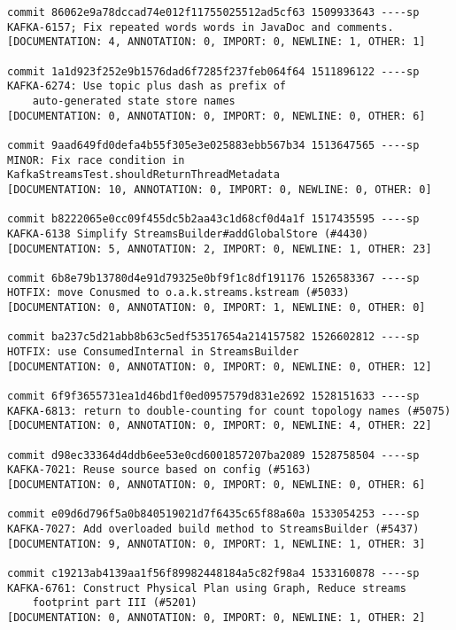 \begin{mdframed}
\begin{lstlisting}
commit 86062e9a78dccad74e012f11755025512ad5cf63 1509933643 ----sp
KAFKA-6157; Fix repeated words words in JavaDoc and comments.                                       
[DOCUMENTATION: 4, ANNOTATION: 0, IMPORT: 0, NEWLINE: 1, OTHER: 1]

commit 1a1d923f252e9b1576dad6f7285f237feb064f64 1511896122 ----sp
KAFKA-6274: Use topic plus dash as prefix of 
    auto-generated state store names
[DOCUMENTATION: 0, ANNOTATION: 0, IMPORT: 0, NEWLINE: 0, OTHER: 6]

commit 9aad649fd0defa4b55f305e3e025883ebb567b34 1513647565 ----sp
MINOR: Fix race condition in KafkaStreamsTest.shouldReturnThreadMetadata                            
[DOCUMENTATION: 10, ANNOTATION: 0, IMPORT: 0, NEWLINE: 0, OTHER: 0]

commit b8222065e0cc09f455dc5b2aa43c1d68cf0d4a1f 1517435595 ----sp
KAFKA-6138 Simplify StreamsBuilder#addGlobalStore (#4430)                                           
[DOCUMENTATION: 5, ANNOTATION: 2, IMPORT: 0, NEWLINE: 1, OTHER: 23]

commit 6b8e79b13780d4e91d79325e0bf9f1c8df191176 1526583367 ----sp
HOTFIX: move Conusmed to o.a.k.streams.kstream (#5033)                                              
[DOCUMENTATION: 0, ANNOTATION: 0, IMPORT: 1, NEWLINE: 0, OTHER: 0]

commit ba237c5d21abb8b63c5edf53517654a214157582 1526602812 ----sp
HOTFIX: use ConsumedInternal in StreamsBuilder                                                      
[DOCUMENTATION: 0, ANNOTATION: 0, IMPORT: 0, NEWLINE: 0, OTHER: 12]

commit 6f9f3655731ea1d46bd1f0ed0957579d831e2692 1528151633 ----sp
KAFKA-6813: return to double-counting for count topology names (#5075)                              
[DOCUMENTATION: 0, ANNOTATION: 0, IMPORT: 0, NEWLINE: 4, OTHER: 22]

commit d98ec33364d4ddb6ee53e0cd6001857207ba2089 1528758504 ----sp
KAFKA-7021: Reuse source based on config (#5163)                                                    
[DOCUMENTATION: 0, ANNOTATION: 0, IMPORT: 0, NEWLINE: 0, OTHER: 6]

commit e09d6d796f5a0b840519021d7f6435c65f88a60a 1533054253 ----sp
KAFKA-7027: Add overloaded build method to StreamsBuilder (#5437)                                   
[DOCUMENTATION: 9, ANNOTATION: 0, IMPORT: 1, NEWLINE: 1, OTHER: 3]

commit c19213ab4139aa1f56f89982448184a5c82f98a4 1533160878 ----sp
KAFKA-6761: Construct Physical Plan using Graph, Reduce streams 
    footprint part III (#5201)
[DOCUMENTATION: 0, ANNOTATION: 0, IMPORT: 0, NEWLINE: 1, OTHER: 2]


\end{lstlisting}
\end{mdframed}
